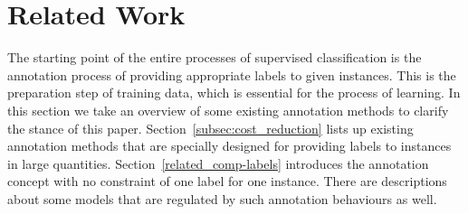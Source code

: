 \documentclass[a4paper,conference]{IEEEtran}
\begin{document}
\section{Related Work}\label{sec:related_work}
The starting point of the entire processes of supervised classification is the annotation process of providing appropriate labels to given instances. 
This is the preparation step of training data, which is essential for the process of learning.
In this section we take an overview of some existing annotation methods to clarify the stance of this paper.
Section~\ref{subsec:cost_reduction} lists up existing annotation methods that are specially designed for providing labels to instances in large quantities.  
Section~\ref{related_comp-labels} introduces the annotation concept with no constraint of one label for one instance.
There are descriptions about some models that are regulated by such annotation behaviours as well.

\end{document}
